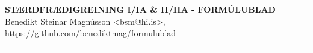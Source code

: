 \documentclass[11pt,icelandic]{article}
\begin{document}

\begin{center}
	{\Large\bf STÆRÐFRÆÐIGREINING I/IA \& II/IIA - FORMÚLUBLAÐ}\\
    Benedikt Steinar Magnússon <bsm@hi.is>, \url{https://github.com/benediktmag/formulublad}
\end{center}

\hrule




\end{document}
